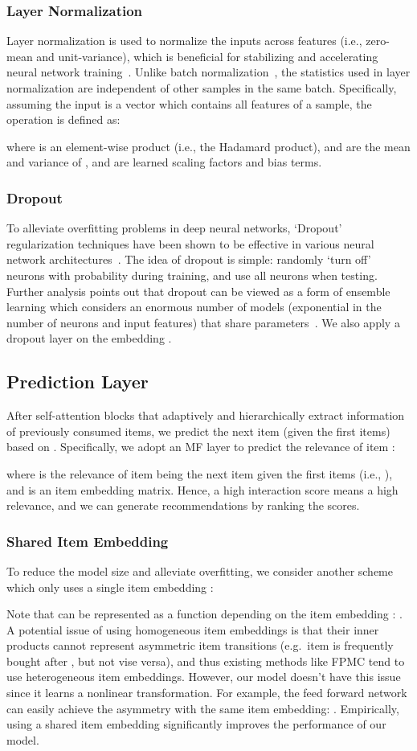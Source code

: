 \documentclass[conference]{IEEEtran}
\newcommand{\xhdr}[1]{\subsubsection*{\bf #1}}
\begin{document}
\xhdr{Layer Normalization} Layer normalization is 
used
to normalize the inputs across features (i.e., zero-mean and unit-variance), which is beneficial for stabilizing and accelerating 
neural network training~\cite{DBLP:journals/corr/BaKH16}. Unlike 
batch normalization~\cite{DBLP:conf/icml/IoffeS15}, the statistics used in layer normalization are independent of other samples in the same batch. Specifically, assuming the input is a vector  which contains all features of a sample, the operation is defined as:

where  is an element-wise product (i.e., the Hadamard product),  and  
are
the mean and variance of ,  and  are learned scaling factors and bias terms.

\xhdr{Dropout} To alleviate 
overfitting problems in deep neural networks, 
`Dropout' regularization techniques have
been shown to be effective in various neural network
architectures~\cite{DBLP:journals/jmlr/SrivastavaHKSS14}. The idea of dropout is simple: randomly
`turn off'
neurons with probability  during
training, and 
use 
all neurons when testing. Further analysis points out that dropout can be viewed as a form of ensemble learning which considers
an
enormous number of models (exponential in the number of neurons and input features) that share parameters~\cite{DBLP:journals/corr/Warde-FarleyGCB13}. We also apply a dropout layer on the embedding .


\subsection{Prediction Layer}
After  self-attention blocks that adaptively and hierarchically extract information of previously 
consumed
items, we predict the next item (given the first  items) based on . Specifically, we adopt an MF layer to predict the relevance of item :

where  is the relevance of item  being the next item given the first  items (i.e., ), and  is an item embedding matrix. Hence, a high interaction score  means a high relevance, and we can generate recommendations by ranking the scores.

\xhdr{Shared Item Embedding} To reduce the model size and alleviate overfitting, we consider another scheme which only uses a single item embedding :

Note that  can be represented as a function depending on 
the
item embedding : . A potential issue of using homogeneous item embeddings is that their inner products cannot represent asymmetric item transitions (e.g.~item  is frequently bought after , but not vise versa), and thus existing methods like FPMC tend to use heterogeneous item embeddings. However, our model doesn't have this issue since it learns a nonlinear transformation. For example, the feed forward network can easily achieve the asymmetry with the same item embedding: . Empirically, 
using a shared item embedding 
significantly improves the performance of our model.
\end{document}
